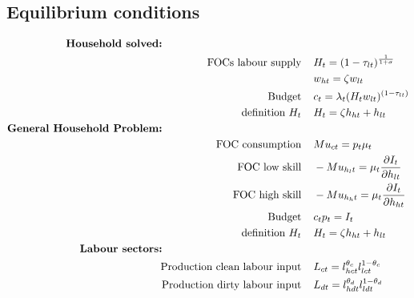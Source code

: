\subsection{Equilibrium conditions}

\begin{align*}
\text{\textbf{Household solved:}} \hspace{50mm}& \\
\text{FOCs labour supply}\hspace{4mm}&  %
H_t=(1-\tau_{lt})^\frac{1}{1+\sigma}\\
\ \hspace{4mm} & %
w_{ht}=\zeta w_{lt}\\
\text{Budget}\hspace{4mm}&  %
c_t= \lambda_t (H_tw_{lt})^{(1-\tau_{lt})}\\
\text{definition}\  H_t\hspace{4mm} & %
H_t=\zeta h_{ht}+h_{lt}
\\
\text{\textbf{General Household Problem:}} \hspace{50mm}& \\
\text{FOC consumption}\hspace{4mm}& Mu_{ct}=p_t\mu_t\\
\text{FOC low skill}\hspace{4mm} & -Mu_{h_lt}=\mu_t \frac{\partial I_t}{\partial h_{lt}}\\
\text{FOC high skill}\hspace{4mm} & -Mu_{h_ht}=\mu_t \frac{\partial I_t}{\partial h_{ht}}\\
\text{Budget}\hspace{4mm}& c_tp_t= I_t\\
\text{definition}\  H_t\hspace{4mm} & H_t=\zeta h_{ht}+h_{lt}\\
\text{\textbf{Labour sectors:}}\hspace{50mm}&\\
\text{Production clean labour input} \hspace{4mm}& L_{ct}=l_{hct}^{\theta_c}l_{lct}^{1-\theta_c}\\ 
\text{Production dirty labour input} \hspace{4mm}& L_{dt}=l_{hdt}^{\theta_d}l_{ldt}^{1-\theta_d}\\

\end{align*}
